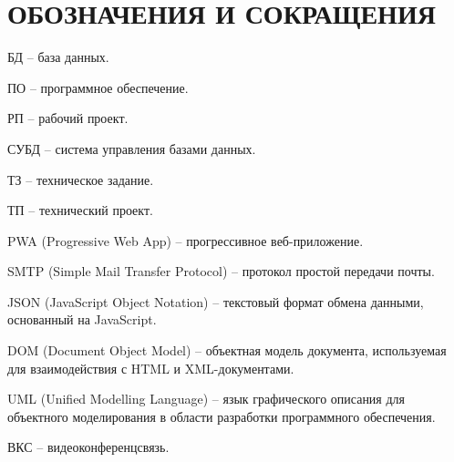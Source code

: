 \section*{ОБОЗНАЧЕНИЯ И СОКРАЩЕНИЯ}

БД -- база данных.

ПО -- программное обеспечение.

РП -- рабочий проект.

СУБД -- система управления базами данных.

ТЗ -- техническое задание.

ТП -- технический проект.

PWA (Progressive Web App) -- прогрессивное веб-приложение.

SMTP (Simple Mail Transfer Protocol) -- протокол простой передачи почты.

JSON (JavaScript Object Notation) -- текстовый формат обмена данными, основанный на JavaScript.

DOM (Document Object Model) -- объектная модель документа, используемая для взаимодействия с HTML и XML-документами.

UML (Unified Modelling Language) -- язык графического описания для объектного моделирования в области разработки программного обеспечения.

ВКС -- видеоконференцсвязь.
